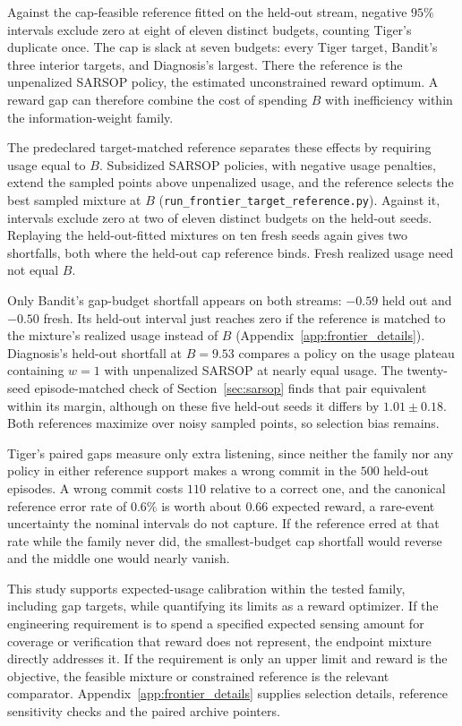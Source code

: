 \documentclass[runningheads]{llncs}
\begin{document}
Against the cap-feasible reference fitted on the held-out stream, negative $95\%$ intervals exclude zero at eight of eleven distinct budgets, counting Tiger's duplicate once. The cap is slack at seven budgets: every Tiger target, Bandit's three interior targets, and Diagnosis's largest. There the reference is the unpenalized SARSOP policy, the estimated unconstrained reward optimum. A reward gap can therefore combine the cost of spending $B$ with inefficiency within the information-weight family.

The predeclared target-matched reference separates these effects by requiring usage equal to $B$. Subsidized SARSOP policies, with negative usage penalties, extend the sampled points above unpenalized usage, and the reference selects the best sampled mixture at $B$ (\texttt{run\_\allowbreak frontier\_\allowbreak target\_\allowbreak reference.py}). Against it, intervals exclude zero at two of eleven distinct budgets on the held-out seeds. Replaying the held-out-fitted mixtures on ten fresh seeds again gives two shortfalls, both where the held-out cap reference binds. Fresh realized usage need not equal $B$.

Only Bandit's gap-budget shortfall appears on both streams: $-0.59$ held out and $-0.50$ fresh. Its held-out interval just reaches zero if the reference is matched to the mixture's realized usage instead of $B$ (Appendix~\ref{app:frontier_details}). Diagnosis's held-out shortfall at $B{=}9.53$ compares a policy on the usage plateau containing $w{=}1$ with unpenalized SARSOP at nearly equal usage. The twenty-seed episode-matched check of Section~\ref{sec:sarsop} finds that pair equivalent within its margin, although on these five held-out seeds it differs by $1.01\pm0.18$. Both references maximize over noisy sampled points, so selection bias remains.

Tiger's paired gaps measure only extra listening, since neither the family nor any policy in either reference support makes a wrong commit in the $500$ held-out episodes. A wrong commit costs $110$ relative to a correct one, and the canonical reference error rate of $0.6\%$ is worth about $0.66$ expected reward, a rare-event uncertainty the nominal intervals do not capture. If the reference erred at that rate while the family never did, the smallest-budget cap shortfall would reverse and the middle one would nearly vanish.

This study supports expected-usage calibration within the tested family, including gap targets, while quantifying its limits as a reward optimizer. If the engineering requirement is to spend a specified expected sensing amount for coverage or verification that reward does not represent, the endpoint mixture directly addresses it. If the requirement is only an upper limit and reward is the objective, the feasible mixture or constrained reference is the relevant comparator. Appendix~\ref{app:frontier_details} supplies selection details, reference sensitivity checks and the paired archive pointers.
\end{document}
